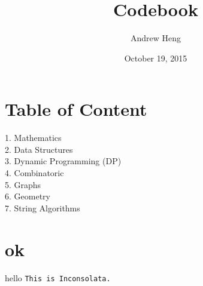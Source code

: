 \documentclass{article}
\begin{document}
\begin{titlepage}
\title{Codebook}
	\author{Andrew Heng}
	\date{October 19, 2015}
	\maketitle
\end{titlepage}

\section{Table of Content}\label{sec:intro}
1. Mathematics\\
2. Data Structures \\
3. Dynamic Programming (DP)\\
4. Combinatoric\\
5. Graphs\\
6. Geometry\\
7. String Algorithms \\

\section{ok}
hello
\texttt{This is Inconsolata.}
\end{document}
